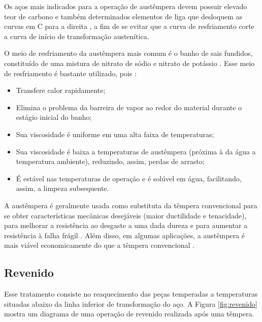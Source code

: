\documentclass[
12pt,
openany, %
oneside, %
a4paper,			
english,			
brazil			        %
]{abntbibufjf}
\begin{document}
	Os aços mais indicados para a operação de austêmpera devem possuir elevado teor de carbono e também determinados elementos de liga que desloquem as curvas em C para a direita \cite{chiaverini2003tratamentos}, a fim de se evitar que a curva de resfriamento corte a curva de início de transformação austenítica.
	
	O meio de resfriamento da austêmpera mais comum é o banho de sais fundidos, constituído de uma mistura de nitrato de sódio e nitrato de potássio \cite{chiaverini2003tratamentos}. Esse meio de resfriamento é bastante utilizado, pois \cite{asm1991heat}:
	
	\begin{itemize}
		\item Transfere calor rapidamente;
		\item Elimina o problema da barreira de vapor ao redor do material durante o estágio inicial do banho;
		\item Sua viscosidade é uniforme em uma alta faixa de temperaturas;
		\item Sua viscosidade é baixa a temperaturas de austêmpera (próxima à da água a temperatura ambiente), reduzindo, assim, perdas de arrasto;
		\item É estável nas temperaturas de operação e é solúvel em água, facilitando, assim, a limpeza subsequente.
	\end{itemize}

	A austêmpera é geralmente usada como substituta da têmpera convencional para se obter características mecânicas desejáveis (maior ductilidade e tenacidade), para melhorar a resistência ao desgaste a uma dada dureza e para aumentar a resistência à falha frágil \cite{asm1991heat}. Além disso, em algumas aplicações, a austêmpera é mais viável economicamente do que a têmpera convencional \cite{asm1991heat}.


\subsection{Revenido}
	Esse tratamento consiste no reaquecimento das peças temperadas a temperaturas situadas abaixo da linha inferior de transformação do aço. A Figura \ref{fig:revenido} mostra um diagrama de uma operação de revenido realizada após uma têmpera.
\end{document}
